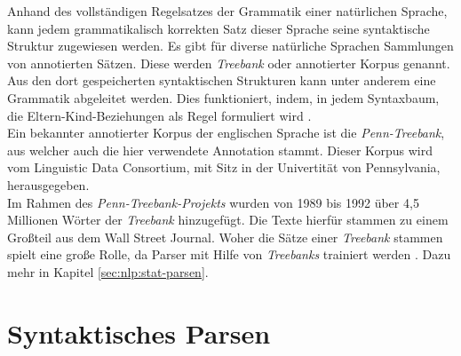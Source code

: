 Anhand des vollständigen Regelsatzes der Grammatik einer natürlichen Sprache, kann jedem grammatikalisch korrekten Satz dieser Sprache seine syntaktische Struktur zugewiesen werden. Es gibt für diverse natürliche Sprachen Sammlungen von annotierten Sätzen. Diese werden \textit{Treebank} oder annotierter Korpus genannt. Aus den dort gespeicherten syntaktischen Strukturen kann unter anderem eine Grammatik abgeleitet werden. Dies funktioniert, indem, in jedem Syntaxbaum, die Eltern-Kind-Beziehungen als Regel formuliert wird \cite[Kapitel 10]{nlpGrundlagen}.\\
Ein bekannter annotierter Korpus der englischen Sprache ist die \textit{Penn-Treebank}, aus welcher auch die hier verwendete Annotation stammt. Dieser Korpus wird vom Linguistic Data Consortium, mit Sitz in der Univertität von Pennsylvania, herausgegeben. \cite{ldc} \\ %
Im Rahmen des \textit{Penn-Treebank-Projekts} wurden von 1989 bis 1992 über 4,5 Millionen Wörter der \textit{Treebank} hinzugefügt. Die Texte hierfür stammen zu einem Großteil aus dem Wall Street Journal. Woher die Sätze einer \textit{Treebank} stammen spielt eine große Rolle, da Parser mit Hilfe von \textit{Treebanks} trainiert werden \cite{ptbInformationen}. Dazu mehr in Kapitel \ref{sec:nlp:stat-parsen}.  %

\section{Syntaktisches Parsen}
\label{sec:nlp:syn-parsen}

